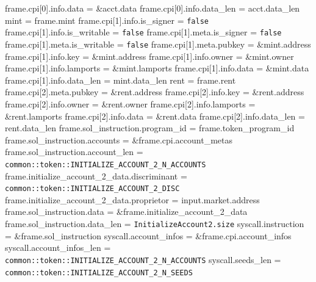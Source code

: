 \begin{algorithm}
\begin{algorithmic}
  \STATE frame.cpi[0].info.data = \&acct.data
  \STATE frame.cpi[0].info.data\_len = acct.data\_len
  \STATE mint = frame.mint
  \STATE frame.cpi[1].info.is\_signer = \texttt{false}
  \STATE frame.cpi[1].info.is\_writable = \texttt{false}
  \STATE frame.cpi[1].meta.is\_signer = \texttt{false}
  \STATE frame.cpi[1].meta.is\_writable = \texttt{false}
  \STATE frame.cpi[1].meta.pubkey = \&mint.address
  \STATE frame.cpi[1].info.key = \&mint.address
  \STATE frame.cpi[1].info.owner = \&mint.owner
  \STATE frame.cpi[1].info.lamports = \&mint.lamports
  \STATE frame.cpi[1].info.data = \&mint.data
  \STATE frame.cpi[1].info.data\_len = mint.data\_len
  \STATE rent = frame.rent
  \STATE frame.cpi[2].meta.pubkey = \&rent.address
  \STATE frame.cpi[2].info.key = \&rent.address
  \STATE frame.cpi[2].info.owner = \&rent.owner
  \STATE frame.cpi[2].info.lamports = \&rent.lamports
  \STATE frame.cpi[2].info.data = \&rent.data
  \STATE frame.cpi[2].info.data\_len = rent.data\_len
  \STATE frame.sol\_instruction.program\_id = frame.token\_program\_id
  \STATE frame.sol\_instruction.accounts = \&frame.cpi.account\_metas
  \STATE frame.sol\_instruction.account\_len =
    \texttt{common::token::INITIALIZE\_ACCOUNT\_2\_N\_ACCOUNTS}
  \STATE frame.initialize\_account\_2\_data.discriminant =
    \texttt{common::token::INITIALIZE\_ACCOUNT\_2\_DISC}
  \STATE frame.initialize\_account\_2\_data.proprietor = input.market.address
  \STATE frame.sol\_instruction.data = \&frame.initialize\_account\_2\_data
  \STATE frame.sol\_instruction.data\_len = \texttt{InitializeAccount2.size}
  \STATE syscall.instruction = \&frame.sol\_instruction
  \STATE syscall.account\_infos = \&frame.cpi.account\_infos
  \STATE syscall.account\_infos\_len =
    \texttt{common::token::INITIALIZE\_ACCOUNT\_2\_N\_ACCOUNTS}
  \STATE syscall.seeds\_len = \texttt{common::token::INITIALIZE\_ACCOUNT\_2\_N\_SEEDS}
  \STATE {}
\ENDFUNCTION
\end{algorithmic}
\end{algorithm}
